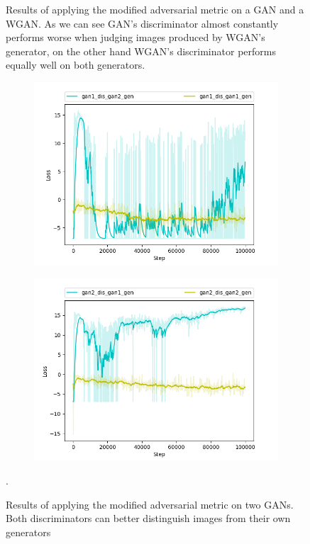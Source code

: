 \begin{figure}[h]
\begin{subfigure}[b]{0.5\textwidth}
	\end{subfigure}
	\caption{Results of applying the modified adversarial metric on a GAN and a WGAN. As we can see GAN's discriminator almost constantly performs worse when judging images produced by WGAN's generator, on the other hand WGAN's discriminator performs equally well on both generators.}
	\label{fig:cd_wgan_vs_gan}
\end{figure}

\begin{figure}[h]
	\begin{subfigure}[b]{0.5\textwidth}
		\includegraphics[width=\textwidth]{figures/gan1_dis_gan2_gen}
	\end{subfigure}
	\begin{subfigure}[b]{0.5\textwidth}
		\includegraphics[width=\textwidth]{figures/gan2_dis_gan1_gen}
	\end{subfigure}
	\caption{Results of applying the modified adversarial metric on two GANs. Both discriminators can better distinguish images from their own generators}.
	\label{fig:cd_gan_vs_gan}
\end{figure}


